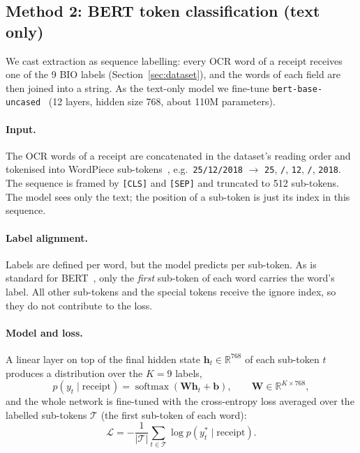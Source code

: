 
\subsection{Method 2: BERT token classification (text only)}
\label{sec:bert}

We cast extraction as sequence labelling: every OCR word of a receipt receives one of the 9 BIO labels (Section~\ref{sec:dataset}), and the words of each field are then joined into a string. As the text-only model we fine-tune \texttt{bert-base-uncased}~\cite{devlin2019bert} (12 layers, hidden size 768, about 110M parameters).

\paragraph{Input.}
The OCR words of a receipt are concatenated in the dataset's reading order and tokenised into WordPiece sub-tokens~\cite{wu2016google}, e.g.\ \texttt{25/12/2018} $\rightarrow$ \texttt{25}, \texttt{/}, \texttt{12}, \texttt{/}, \texttt{2018}. The sequence is framed by \texttt{[CLS]} and \texttt{[SEP]} and truncated to 512 sub-tokens. The model sees only the text; the position of a sub-token is just its index in this sequence.

\paragraph{Label alignment.}
Labels are defined per word, but the model predicts per sub-token. As is standard for BERT~\cite{devlin2019bert}, only the \emph{first} sub-token of each word carries the word's label. All other sub-tokens and the special tokens receive the ignore index, so they do not contribute to the loss.

\paragraph{Model and loss.}
A linear layer on top of the final hidden state $\mathbf{h}_t \in \mathbb{R}^{768}$ of each sub-token $t$ produces a distribution over the $K=9$ labels,
\begin{equation}
  p(y_t \mid \text{receipt}) = \operatorname{softmax}\!\left(\mathbf{W}\mathbf{h}_t + \mathbf{b}\right), \qquad \mathbf{W} \in \mathbb{R}^{K \times 768},
\end{equation}
and the whole network is fine-tuned with the cross-entropy loss averaged over the labelled sub-tokens $\mathcal{T}$ (the first sub-token of each word):
\begin{equation}
  \mathcal{L} = -\frac{1}{|\mathcal{T}|} \sum_{t \in \mathcal{T}} \log p(y_t^{*} \mid \text{receipt}).
\end{equation}

